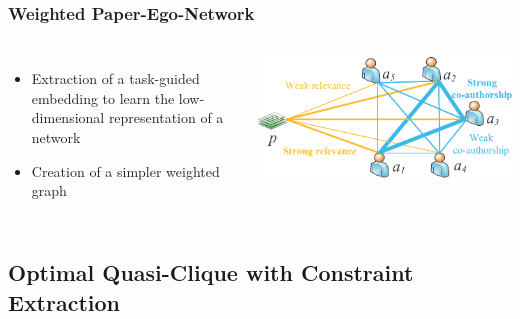 \begin{frame}
\frametitle{Weighted Paper-Ego-Network}
\begin{columns}

\begin{itemize}
    \item Extraction of a task-guided embedding to learn the low-dimensional representation of a network
    \item Creation of a simpler weighted graph
\end{itemize}

\includegraphics[width=1\linewidth]{img/paper-ego}


\end{columns}
\end{frame}
\subsection{Optimal Quasi-Clique with Constraint Extraction}


